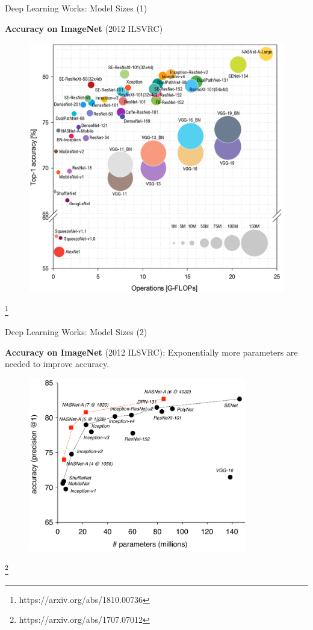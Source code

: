 \documentclass[notheorems]{beamer}
\newcommand{\source}[1]{{\let\thefootnote\relax\footnote{{\tiny #1}}}}
\begin{document}
    \begin{frame}{Deep Learning Works: Model Sizes (1)}
        \begin{center}
            \textbf{Accuracy on ImageNet} (2012 ILSVRC)
        \end{center}
        \begin{figure}
            \centering
            \includegraphics[width=0.7\linewidth]{figures/FLOPS1}
        \end{figure}

        \source{https://arxiv.org/abs/1810.00736}

    \end{frame}

    \begin{frame}{Deep Learning Works: Model Sizes (2)}

        \textbf{Accuracy on ImageNet} (2012 ILSVRC): Exponentially more parameters are needed to improve accuracy.
        \begin{figure}
            \centering
            \includegraphics[width=0.85\textwidth]{figures/Params-Diagram-SE}
        \end{figure}

        \source{https://arxiv.org/abs/1707.07012}

    \end{frame}
\end{document}
